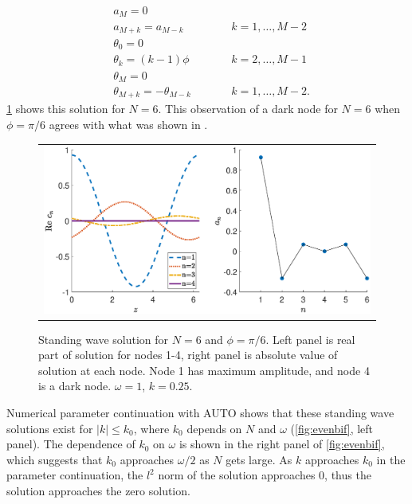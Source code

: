 \documentclass[12pt,reqno]{amsart}
\begin{document}
\begin{align*}
&a_M = 0 \\
&a_{M+k} = a_{M-k} && \qquad k = 1, \dots, M-2 \\
&\theta_0 = 0 \\
&\theta_k = (k-1)\phi && \qquad  k = 2, \dots, M-1 \\
&\theta_M = 0 \\
&\theta_{M+k} = -\theta_{M-k} && \qquad k = 1, \dots, M-2.
\end{align*}
\cref{fig:evenhole6} shows this solution for $N=6$. This observation of a dark node for $N = 6$ when $\phi = \pi/6$ agrees with what was shown in \cite{castro2016}. 
\begin{figure}[H]
\begin{center}
\begin{tabular}{c}
\includegraphics[width=15cm]{images/evenhole6.eps}
\end{tabular}
\end{center}
\caption{Standing wave solution for $N = 6$ and $\phi = \pi/6$. Left panel is real part of solution for nodes 1-4, right panel is absolute value of solution at each node. Node 1 has maximum amplitude, and node 4 is a dark node. $\omega = 1$, $k = 0.25$.}
\label{fig:evenhole6}
\end{figure}
Numerical parameter continuation with AUTO shows that these standing wave solutions exist for $|k| \leq k_0$, where $k_0$ depends on $N$ and $\omega$ (\cref{fig:evenbif}, left panel). The dependence of $k_0$ on $\omega$ is shown in the right panel of \cref{fig:evenbif}, which suggests that $k_0$ approaches $\omega/2$ as $N$ gets large. As $k$ approaches $k_0$ in the parameter continuation, the $l^2$ norm of the solution approaches 0, thus the solution approaches the zero solution. 
\end{document}

